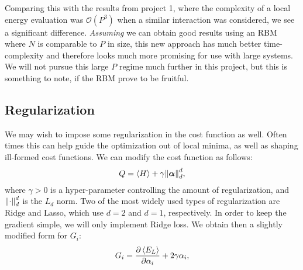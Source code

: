 \documentclass[a4paper, 11pt]{article}
\begin{document}
\begin{multicols}{2}
    Comparing this with the results from project 1, where the complexity of a
    local energy evaluation was $\mathcal{O}(P^3)$ when a similar interaction
    was considered, we see a significant
    difference. \emph{Assuming} we can obtain good results using an RBM where $N$ is
    comparable to $P$ in size, this new approach has much better time-complexity
    and therefore looks much more promising for use with large systems. We will
    not pursue this large $P$ regime much further in this project, but this is
    something to note, if the RBM prove to be fruitful.

    \subsection{Regularization}

    We may wish to impose some regularization in the cost function as well.
    Often times this can help guide the optimization out of local minima, as
    well as shaping ill-formed cost functions. We can modify the cost function
    as follows:
    \begin{align}
        Q = \expval{H} + \gamma\norm{\bm \alpha}_d^d,
    \end{align} 
    where $\gamma>0$ is a hyper-parameter controlling the amount of
    regularization, and $\norm{\cdot}_d^d$ is the $L_d$ norm. Two of the most widely used
    types of regularization are Ridge and Lasso, which use $d=2$ and $d=1$,
    respectively. In order to keep the gradient simple, we will only implement
    Ridge loss. We obtain then a slightly modified form for $G_i$:
    \begin{align}
        G_i = \pdv{\expval{E_L}}{\alpha_i} +
        2\gamma\alpha_i,\label{eq:G-i-ridge}
    \end{align}

    \printbibliography

\end{multicols}
\end{document}
